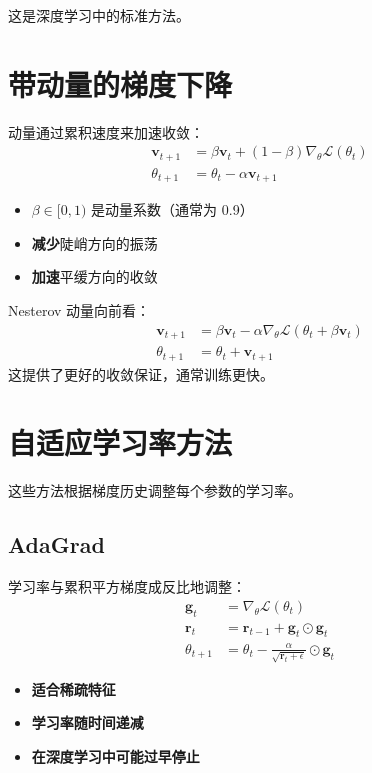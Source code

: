 这是深度学习中的标准方法。

\section{带动量的梯度下降}

动量通过累积速度来加速收敛：
\begin{align}
\mathbf{v}_{t+1} &= \beta \mathbf{v}_t + (1-\beta)\nabla_\theta \mathcal{L}(\theta_t) \\
\theta_{t+1} &= \theta_t - \alpha \mathbf{v}_{t+1}
\end{align}

\begin{itemize}
    \item $\beta \in [0, 1)$ 是动量系数（通常为 0.9）
    \item \textbf{减少}陡峭方向的振荡
    \item \textbf{加速}平缓方向的收敛
\end{itemize}

\begin{note}
Nesterov 动量向前看：
\begin{align}
\mathbf{v}_{t+1} &= \beta \mathbf{v}_t - \alpha \nabla_\theta \mathcal{L}(\theta_t + \beta\mathbf{v}_t) \\
\theta_{t+1} &= \theta_t + \mathbf{v}_{t+1}
\end{align}
这提供了更好的收敛保证，通常训练更快。
\end{note}

\section{自适应学习率方法}

这些方法根据梯度历史调整每个参数的学习率。

\subsection{AdaGrad}

学习率与累积平方梯度成反比地调整：
\begin{align}
\mathbf{g}_t &= \nabla_\theta \mathcal{L}(\theta_t) \\
\mathbf{r}_t &= \mathbf{r}_{t-1} + \mathbf{g}_t \odot \mathbf{g}_t \\
\theta_{t+1} &= \theta_t - \frac{\alpha}{\sqrt{\mathbf{r}_t + \epsilon}} \odot \mathbf{g}_t
\end{align}

\begin{itemize}
    \item \textbf{适合稀疏特征}
    \item \textbf{学习率随时间递减}
    \item \textbf{在深度学习中可能过早停止}
\end{itemize}

